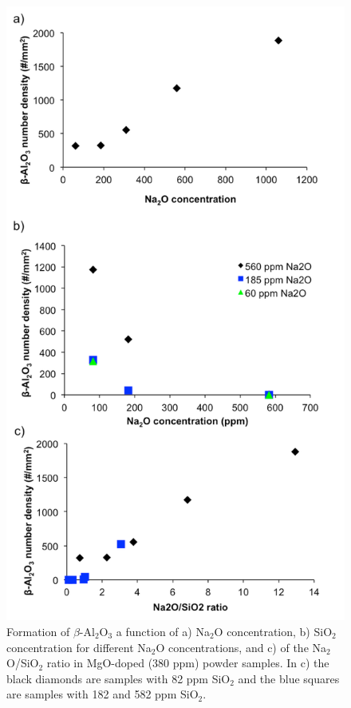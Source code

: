 \newpage
\begin{figure}[H]
	\centering
	\includegraphics{Chapter-5/Figures/Figure3.png}
	\caption{Formation of $\beta$-Al$_{2}$O$_{3}$ a function of a) Na$_{2}$O concentration, b) SiO$_{2}$ concentration for different Na$_{2}$O concentrations, and c) of the Na$_{2}$O/SiO$_{2}$ ratio in MgO-doped (380 ppm) powder samples. In c) the black diamonds are samples with 82 ppm SiO$_{2}$ and the blue squares are samples with 182 and 582 ppm SiO$_{2}$.}
	\label{Ch5-figure:Figure3}
\end{figure}

